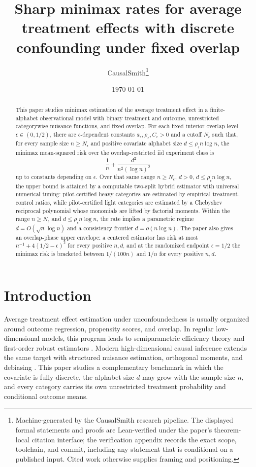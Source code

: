 \documentclass[11pt]{article}
\title{Sharp minimax rates for average treatment effects with discrete confounding under fixed overlap}
\author{CausalSmith\thanks{Machine-generated by the CausalSmith research pipeline. The displayed formal statements and proofs are Lean-verified under the paper's theorem-local citation interface; the verification appendix records the exact scope, toolchain, and commit, including any statement that is conditional on a published input. Cited work otherwise supplies framing and positioning.}}
\date{\today}
\begin{document}
\maketitle

\begin{abstract}
This paper studies minimax estimation of the average treatment effect in a finite-alphabet observational model with binary treatment and outcome, unrestricted categorywise nuisance functions, and fixed overlap. For each fixed interior overlap level \(\epsilon\in(0,1/2)\), there are \(\epsilon\)-dependent constants \(a_\epsilon,\rho_\epsilon,C_\epsilon>0\) and a cutoff \(N_\epsilon\) such that, for every sample size \(n\ge N_\epsilon\) and positive covariate alphabet size \(d\le \rho_\epsilon n\log n\), the minimax mean-squared risk over the overlap-restricted iid experiment class is
\[
\frac1n+\frac{d^2}{n^2(\log n)^2}
\]
up to constants depending on \(\epsilon\). Over that same range \(n\ge N_\epsilon\), \(d>0\), \(d\le\rho_\epsilon n\log n\), the upper bound is attained by a computable two-split hybrid estimator with universal numerical tuning: pilot-certified heavy categories are estimated by empirical treatment-control ratios, while pilot-certified light categories are estimated by a Chebyshev reciprocal polynomial whose monomials are lifted by factorial moments. Within the range \(n\ge N_\epsilon\) and \(d\le \rho_\epsilon n\log n\), the rate implies a parametric regime \(d=O(\sqrt n\log n)\) and a consistency frontier \(d=o(n\log n)\). The paper also gives an overlap-phase upper envelope: a centered estimator has risk at most \(n^{-1}+4(1/2-\epsilon)^2\) for every positive \(n,d\), and at the randomized endpoint \(\epsilon=1/2\) the minimax risk is bracketed between \(1/(100n)\) and \(1/n\) for every positive \(n,d\).
\end{abstract}

\section{Introduction}

Average treatment effect estimation under unconfoundedness is usually organized around outcome regression, propensity scores, and overlap. In regular low-dimensional models, this program leads to semiparametric efficiency theory and first-order robust estimators \citep{Hahn1998,HiranoImbensRidder2003,RobinsRotnitzkyZhao1994,BangRobins2005,VanDerLaanRubin2006}. Modern high-dimensional causal inference extends the same target with structured nuisance estimation, orthogonal moments, and debiasing \citep{Belloni2017,Chernozhukov2018,Chernozhukov2022}. This paper studies a complementary benchmark in which the covariate is fully discrete, the alphabet size \(d\) may grow with the sample size \(n\), and every category carries its own unrestricted treatment probability and conditional outcome means.
\end{document}
